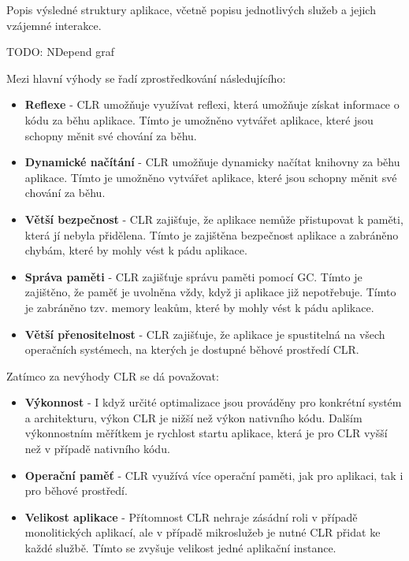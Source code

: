 


Popis výsledné struktury aplikace, včetně popisu jednotlivých služeb a jejich vzájemné interakce.

TODO: NDepend graf




Mezi hlavní výhody se řadí zprostředkování následujícího:

\begin{itemize}
    \item  \textbf{Reflexe} - CLR umožňuje využívat reflexi, která umožňuje získat informace o kódu za běhu aplikace. Tímto je umožněno vytvářet aplikace, které jsou schopny měnit své chování za běhu.
    \item \textbf{Dynamické načítání} - CLR umožňuje dynamicky načítat knihovny za běhu aplikace. Tímto je umožněno vytvářet aplikace, které jsou schopny měnit své chování za běhu.
    \item \textbf{Větší bezpečnost} - CLR zajišťuje, že aplikace nemůže přistupovat k paměti, která jí nebyla přidělena. Tímto je zajištěna bezpečnost aplikace a zabráněno chybám, které by mohly vést k pádu aplikace.
    \item \textbf{Správa paměti} - CLR zajišťuje správu paměti pomocí GC. Tímto je zajištěno, že paměť je uvolněna vždy, když ji aplikace již nepotřebuje. Tímto je zabráněno tzv. memory leakům, které by mohly vést k pádu aplikace.
    \item \textbf{Větší přenositelnost} - CLR zajišťuje, že aplikace je spustitelná na všech operačních systémech, na kterých je dostupné běhové prostředí CLR.
\end{itemize}


Zatímco za nevýhody CLR se dá považovat:

\begin{itemize}
    \item  \textbf{Výkonnost} - I když určité optimalizace jsou prováděny pro konkrétní systém a architekturu, výkon CLR je nižší než výkon nativního kódu. Dalším výkonnostním měřítkem je rychlost startu aplikace, která je pro CLR vyšší než v případě nativního kódu.
    \item \textbf{Operační paměť} - CLR využívá více operační paměti, jak pro aplikaci, tak i pro běhové prostředí.
    \item \textbf{Velikost aplikace} - Přítomnost CLR nehraje zásádní roli v případě monolitických aplikací, ale v případě mikroslužeb je nutné CLR přidat ke každé službě. Tímto se zvyšuje velikost jedné aplikační instance.
\end{itemize}

